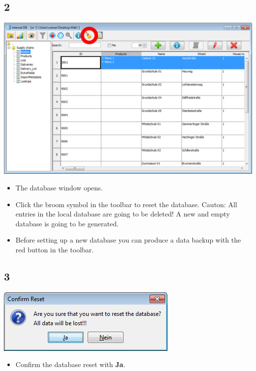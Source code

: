 \documentclass{beamer}
\begin{document}
\subsection{2}
\begin{frame}
	\begin{center}
  		\includegraphics[height=0.6\textheight]{2.png}
	\end{center}
	\begin{itemize}
		\item The database window opens.
		\item Click the broom symbol in the toolbar to reset the database. Cauton: All entries in the local database are going to be deleted! A new and empty database is going to be generated.
		\item Before setting up a new database you can produce a data backup with the red button in the toolbar.
	\end{itemize}
\end{frame}

\subsection{3}
\begin{frame}
	\begin{center}
  		\includegraphics[height=0.3\textheight]{3.png}
	\end{center}
	\begin{itemize}
		\item Confirm the database reset with \textbf{Ja}.
	\end{itemize}
\end{frame}
\end{document}
